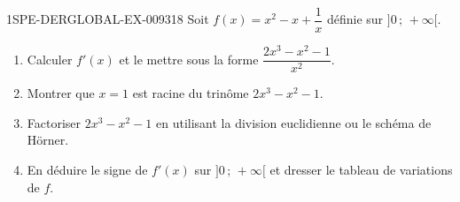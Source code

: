 \begin{exercice}{1SPE-DERGLOBAL-EX-009}{3}{18}
Soit $f(x) = x^2 - x + \dfrac{1}{x}$ définie sur $]0\,;\,+\infty[$.

\begin{enumerate}
  \item Calculer $f'(x)$ et le mettre sous la forme $\dfrac{2x^3 - x^2 - 1}{x^2}$.
  \item Montrer que $x = 1$ est racine du trinôme $2x^3 - x^2 - 1$.
  \item Factoriser $2x^3 - x^2 - 1$ en utilisant la division euclidienne ou le schéma de Hörner.
  \item En déduire le signe de $f'(x)$ sur $]0\,;\,+\infty[$ et dresser le tableau de variations de $f$.
\end{enumerate}
\end{exercice}
